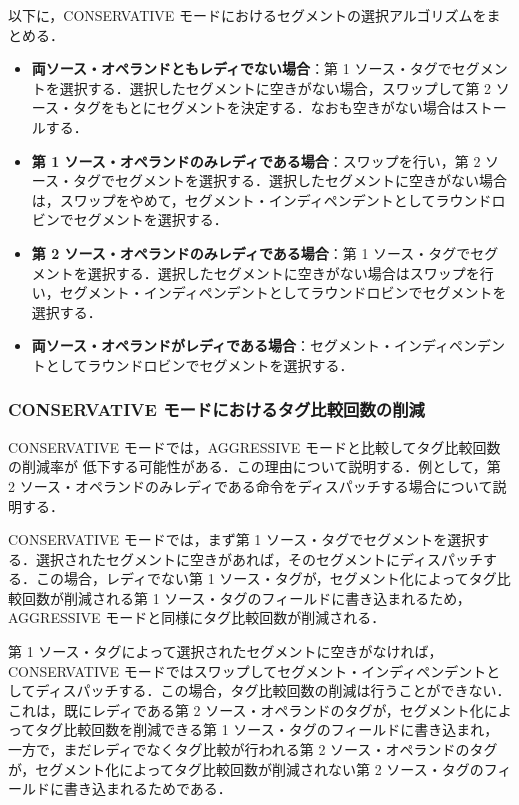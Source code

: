 以下に，CONSERVATIVE モードにおけるセグメントの選択アルゴリズムをまとめる．
\begin{itemize}
  \item \textbf{両ソース・オペランドともレディでない場合}：第 1 ソース・タグでセグメントを選択する．選択したセグメントに空きがない場合，スワップして第 2 ソース・タグをもとにセグメントを決定する．なおも空きがない場合はストールする．
  \item \textbf{第 1 ソース・オペランドのみレディである場合}：スワップを行い，第 2 ソース・タグでセグメントを選択する．選択したセグメントに空きがない場合は，スワップをやめて，セグメント・インディペンデントとしてラウンドロビンでセグメントを選択する．
  \item \textbf{第 2 ソース・オペランドのみレディである場合}：第 1 ソース・タグでセグメントを選択する．選択したセグメントに空きがない場合はスワップを行い，セグメント・インディペンデントとしてラウンドロビンでセグメントを選択する．
  \item \textbf{両ソース・オペランドがレディである場合}：セグメント・インディペンデントとしてラウンドロビンでセグメントを選択する．
\end{itemize}

\subsubsection{CONSERVATIVE モードにおけるタグ比較回数の削減}
CONSERVATIVE モードでは，AGGRESSIVE モードと比較してタグ比較回数の削減率が 低下する可能性がある．この理由について説明する．例として，第 2 ソース・オペランドのみレディである命令をディスパッチする場合について説明する．

CONSERVATIVE モードでは，まず第 1 ソース・タグでセグメントを選択する．選択されたセグメントに空きがあれば，そのセグメントにディスパッチする．この場合，レディでない第 1 ソース・タグが，セグメント化によってタグ比較回数が削減される第 1 ソース・タグのフィールドに書き込まれるため，AGGRESSIVE モードと同様にタグ比較回数が削減される．

第 1 ソース・タグによって選択されたセグメントに空きがなければ，CONSERVATIVE モードではスワップしてセグメント・インディペンデントとしてディスパッチする．この場合，タグ比較回数の削減は行うことができない．これは，既にレディである第 2 ソース・オペランドのタグが，セグメント化によってタグ比較回数を削減できる第 1 ソース・タグのフィールドに書き込まれ，一方で，まだレディでなくタグ比較が行われる第 2 ソース・オペランドのタグが，セグメント化によってタグ比較回数が削減されない第 2 ソース・タグのフィールドに書き込まれるためである．

